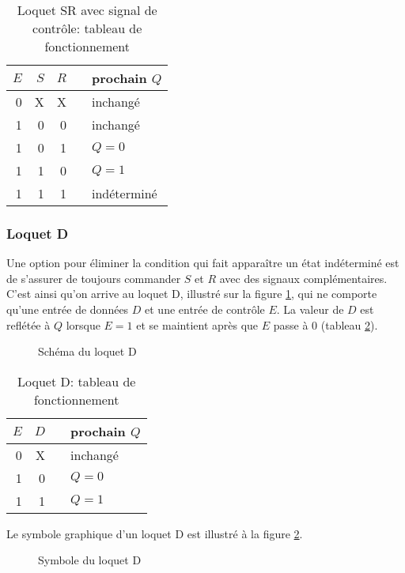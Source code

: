 \documentclass[11pt]{article}
\begin{document}
\begin{table}[htbp]
\caption{\label{tab:orgb897531}Loquet SR avec signal de contrôle: tableau de fonctionnement}
\centering
\begin{tabular}{rrrll}
\(E\) & \(S\) & \(R\) &  & prochain \(Q\)\\
\hline
0 & X & X &  & inchangé\\
1 & 0 & 0 &  & inchangé\\
1 & 0 & 1 &  & \(Q = 0\)\\
1 & 1 & 0 &  & \(Q = 1\)\\
1 & 1 & 1 &  & indéterminé\\
\end{tabular}
\end{table}

\subsubsection{Loquet D}
\label{sec:orgab208df}
Une option pour éliminer la condition qui fait apparaître un état
indéterminé est de s'assurer de toujours commander \(S\) et \(R\)
avec des signaux complémentaires. C'est ainsi qu'on arrive au loquet
D, illustré sur la figure \ref{fig:org415b1a5}, qui ne comporte qu'une entrée de
données \(D\) et une entrée de contrôle \(E\). La valeur de \(D\) est
reflétée à \(Q\) lorsque \(E=1\) et se maintient après que \(E\) passe
à 0 (tableau \ref{tab:orgff05a53}).

\begin{figure}[htbp]
\centering

\caption{\label{fig:org415b1a5}Schéma du loquet D}
\end{figure}

\begin{table}[htbp]
\caption{\label{tab:orgff05a53}Loquet D: tableau de fonctionnement}
\centering
\begin{tabular}{rrll}
\(E\) & \(D\) &  & prochain \(Q\)\\
\hline
0 & X &  & inchangé\\
1 & 0 &  & \(Q = 0\)\\
1 & 1 &  & \(Q = 1\)\\
\end{tabular}
\end{table}

Le symbole graphique d'un loquet D est illustré à la figure \ref{fig:orgd51922f}.

\begin{figure}[htbp]
\centering

\caption{\label{fig:orgd51922f}Symbole du loquet D}
\end{figure}
\end{document}
